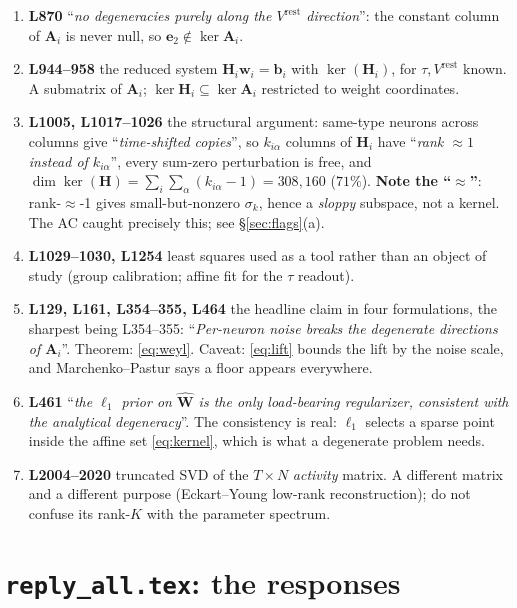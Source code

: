 \documentclass[11pt]{article}
\newcommand{\Mat}[1]{\mathbf{#1}}
\newcommand{\A}{\Mat{A}}
\begin{document}
\begin{enumerate}
\item \textbf{L870} ``\emph{no degeneracies purely along the $V^{\mathrm{rest}}$
direction}'': the constant column of $\A_i$ is never null, so
$\Mat e_2 \notin \ker\A_i$.

\item \textbf{L944--958} the reduced system $\Mat H_i\Mat w_i = \Mat b_i$ with
$\ker(\Mat H_i)$, for $\tau,V^{\mathrm{rest}}$ known. A submatrix of $\A_i$;
$\ker\Mat H_i \subseteq \ker\A_i$ restricted to weight coordinates.

\item \label{it:col} \textbf{L1005, L1017--1026} the structural argument:
same-type neurons across columns give ``\emph{time-shifted copies}'', so
$k_{i\alpha}$ columns of $\Mat H_i$ have ``\emph{rank $\approx 1$ instead of
$k_{i\alpha}$}'', every sum-zero perturbation is free, and
$\dim\ker(\Mat H) = \sum_i\sum_\alpha (k_{i\alpha}-1) = 308{,}160$ ($71\%$).
\textbf{Note the ``$\approx$''}: rank-$\approx$-1 gives small-but-nonzero
$\sigma_k$, hence a \emph{sloppy} subspace, not a kernel. The AC caught precisely
this; see §\ref{sec:flags}(a).

\item \textbf{L1029--1030, L1254} least squares used as a tool rather than an
object of study (group calibration; affine fit for the $\tau$ readout).

\item \textbf{L129, L161, L354--355, L464} the headline claim in four
formulations, the sharpest being L354--355: ``\emph{Per-neuron noise breaks the
degenerate directions of $\A_i$}''. Theorem: \eqref{eq:weyl}. Caveat:
\eqref{eq:lift} bounds the lift by the noise scale, and
Marchenko--Pastur says a floor appears everywhere.

\item \textbf{L461} ``\emph{the $\ell_1$ prior on $\hat{\Mat W}$ is the only
load-bearing regularizer, consistent with the analytical degeneracy}''. The
consistency is real: $\ell_1$ selects a sparse point inside the affine set
\eqref{eq:kernel}, which is what a degenerate problem needs.

\item \textbf{L2004--2020} truncated SVD of the $T\times N$ \emph{activity}
matrix. A different matrix and a different purpose (Eckart--Young low-rank
reconstruction); do not confuse its rank-$K$ with the parameter spectrum.
\end{enumerate}

\section{\texttt{reply\_all.tex}: the responses}
\end{document}
